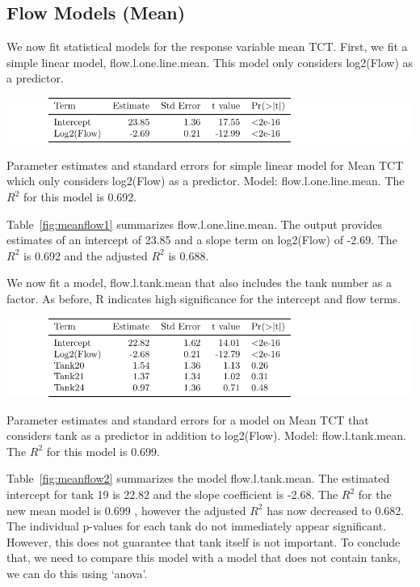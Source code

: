 \subsection{Flow Models (Mean)}

We now fit statistical models for the response variable mean TCT. First, we fit a simple linear model, flow.l.one.line.mean. This model only considers log2(Flow) as a predictor.

\vspace{5mm}


\begin{table}[H]
\includegraphics{Chapter4Images/flowlonelinemean.pdf}
\caption{Parameter estimates and standard errors for simple linear model for Mean TCT which only considers log2(Flow) as a predictor. Model: flow.l.one.line.mean. The $R^{2}$ for this model is 0.692.}
\label{fig:meanflow1}
\end{table}

Table~\ref{fig:meanflow1} summarizes flow.l.one.line.mean. The output provides estimates of an intercept of 23.85 and a slope term on log2(Flow) of -2.69. The $ R^{2}$ is 0.692 and the adjusted $R^{2}$ is 0.688.
 

\newpage

We now fit a model, flow.l.tank.mean that also includes the tank number as a factor.  As before, R indicates high significance for the intercept and flow terms.

\vspace{5mm}

\begin{table}[H]
\includegraphics{Chapter4Images/flowltankmean.pdf}
\caption{Parameter estimates and standard errors for a model on Mean TCT that considers tank as a predictor in addition to log2(Flow). Model: flow.l.tank.mean. The $R^{2}$ for this model is 0.699.}
\label{fig:meanflow2}
\end{table}

Table~\ref{fig:meanflow2} summarizes the model flow.l.tank.mean. The estimated intercept for tank 19  is 22.82 and the slope coefficient is -2.68. The $R^{2}$ for the new mean model is 0.699 , however the adjusted $R^{2}$ has now decreased to 0.682. The individual p-values for each tank do not immediately  appear significant. However, this does not guarantee that tank itself is not important. To conclude that, we need to compare this model with a model that does not contain tanks, we can do this using `anova'.
  


